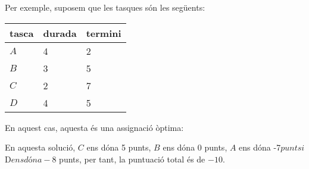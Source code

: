 Per exemple, suposem que les tasques són les següents:
\begin{centre}
\begin{tabular}{lll}
tasca & durada & termini \\
\hline
$A$ & 4 & 2 \\
$B$ & 3 & 5 \\
$C$ & 2 & 7 \\
$D$ & 4 & 5 \\
\end{tabular}
\end{centre}
En aquest cas, aquesta és una assignació òptima:
\begin{center}
\end{center}
En aquesta solució, $C$ ens dóna 5 punts,
$B$ ens dóna 0 punts, $A$ ens dóna -7$ punts
i $D$ ens dóna -8$ punts,
per tant, la puntuació total és de $-10$.

